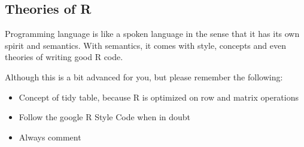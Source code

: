 \subsection{Theories of R}

Programming language is like a spoken language in the sense that it has its own spirit and semantics.  With semantics, it comes with style, concepts and even theories of writing good R code.  

Although this is a bit advanced for you, but please remember the following:

\begin{itemize}
\item Concept of tidy table, because R is optimized on row and matrix operations 
\item Follow the google R Style Code when in doubt
\item Always comment 
\end{itemize}

\newpage